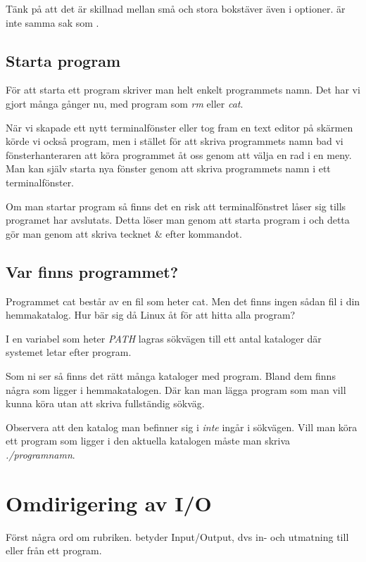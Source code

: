 \documentclass[a4paper,twocolumn]{book}
\begin{document}
Tänk på att det är skillnad mellan små och stora bokstäver även i
optioner.  är inte samma sak som .

\subsection{Starta program}

För att starta ett program skriver man helt enkelt programmets
namn. Det har vi gjort många gånger nu, med program som \emph{rm}
eller \emph{cat}.

När vi skapade ett nytt terminalfönster eller tog fram en text editor på
skärmen körde vi också program, men i stället för att skriva
programmets namn bad vi fönsterhanteraren att köra programmet åt oss
genom att välja en rad i en meny. Man kan själv starta nya fönster
genom att skriva programmets namn i ett terminalfönster.

Om man startar program så finns det en risk att terminalfönstret låser sig
tills programet har avslutats. Detta löser man genom att starta program i 
 och detta gör man genom att skriva tecknet \& efter 
kommandot.
\subsection{Var finns programmet?}

Programmet cat består av en fil som heter cat. Men det finns ingen
sådan fil i din hemmakatalog. Hur bär sig då Linux åt för att hitta
alla program?

I en variabel som heter \emph{PATH} lagras sökvägen till
ett antal kataloger där systemet letar efter program.


Som ni ser så finns det rätt många kataloger med program. Bland dem
finns några som ligger i hemmakatalogen. Där kan man lägga program som
man vill kunna köra utan att skriva fullständig sökväg.

Observera att den katalog man befinner sig i \emph{inte} ingår i
sökvägen. Vill man köra ett program  som ligger i den
aktuella katalogen måste man skriva \emph{./programnamn}.

\section{Omdirigering av I/O}

Först några ord om rubriken.  betyder Input/Output, dvs in-
och utmatning till eller från ett program.
\end{document}
